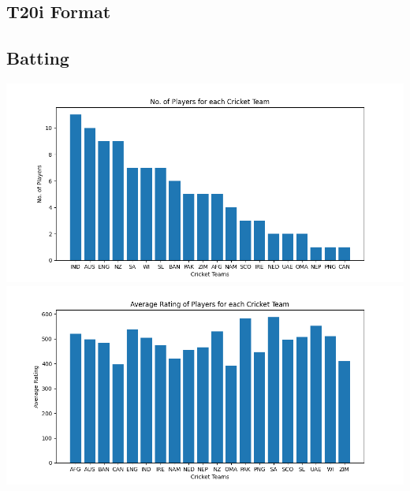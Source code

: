 \documentclass{article}
\begin{document}
    \begin{normalsize}

        \section{T20i Format}\label{sec:t20i-format}
            \subsection{Batting}\label{subsec:batting1}
                \includegraphics[scale=0.75]{t20i_batting_3-10-2023-1}
                \includegraphics[scale=0.75]{t20i_batting_3-10-2023-2}

\end{normalsize}
\end{document}
